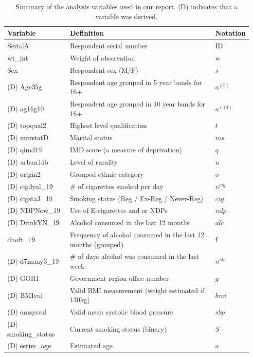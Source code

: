 \documentclass[
  11pt,
  twocolumn]{article}
\begin{document}
\begin{table}

\caption{\label{tab:outputvartable}Summary of the analysis variables used in our report. (D) indicates that a variable was derived.\label{tab:output-var-table}}
\centering
\fontsize{10}{12}\selectfont
\begin{tabular}[t]{>{\raggedright\arraybackslash}p{7em}|>{\raggedright\arraybackslash}p{11em}|l}
\hline
\textbf{Variable} & \textbf{Definition} & \textbf{Notation}\\
\hline
SerialA & Respondent serial number & ID\\
\hline
wt\_int & Weight of observation & w\\
\hline
Sex & Respondent sex (M/F) & $s$\\
\hline
(D) Age35g & Respondent age grouped in 5 year bands for 16+ & $a^{(5)}$\\
\hline
(D) ag16g10 & Respondent age grouped in 10 year bands for 16+ & $a^{(10)}$\\
\hline
(D) topqual2 & Highest level qualification & $t$\\
\hline
(D) marstatD & Marital status & $ms$\\
\hline
(D) qimd19 & IMD score (a measure of deprivation) & $q$\\
\hline
(D) urban14b & Level of rurality & $u$\\
\hline
(D) origin2 & Grouped ethnic category & $o$\\
\hline
(D) cigdyal\_19 & $\#$ of cigarettes smoked per day & $n^{cig}$\\
\hline
(D) cigsta3\_19 & Smoking status (Reg / Ex-Reg / Never-Reg) & $cig$\\
\hline
(D) NDPNow\_19 & Use of E-cigarettes and or NDPs & $ndp$\\
\hline
(D) DrinkYN\_19 & Alcohol consumed in the last 12 months & $alc$\\
\hline
dnoft\_19 & Frequency of alcohol consumed in the last 12 months (grouped) & f\\
\hline
(D) d7many3\_19 & $\#$ of days alcohol was consumed in the last week & $n^{alc}$\\
\hline
(D) GOR1 & Government region office number & $g$\\
\hline
(D) BMIval & Valid BMI measurement (weight estimated if $\>$ 130kg) & $bmi$\\
\hline
(D) omsysval & Valid mean systolic blood pressure & $sbp$\\
\hline
(D) smoking\_status & Current smoking status (binary) & $S$\\
\hline
(D) estim\_age & Estimated age & $a$\\
\hline
\end{tabular}
\end{table}
\end{document}
